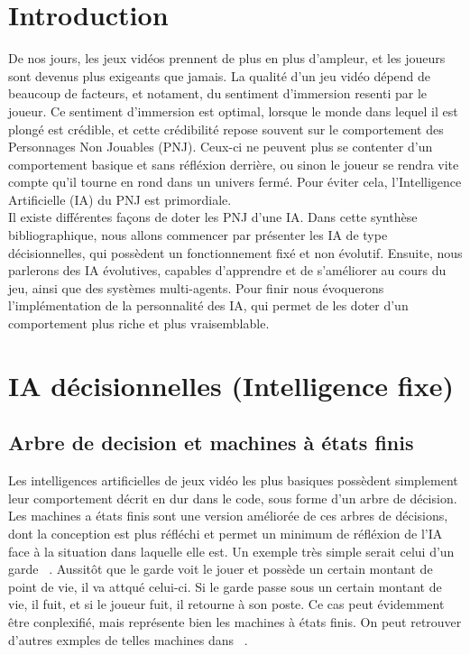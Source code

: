 \documentclass[asi]{picINSA}
\begin{document}
	
	\couverture{}
	
\newpage\null\thispagestyle{empty}\newpage
\tableofcontents{}

\chapter{Introduction}
De nos jours, les jeux vidéos prennent de plus en plus d'ampleur, et les joueurs sont devenus plus exigeants que jamais. La qualité d'un jeu vidéo dépend de beaucoup de facteurs, et notament, du sentiment d'immersion resenti par le joueur. Ce sentiment d'immersion est optimal, lorsque le monde dans lequel il est plongé est crédible, et cette crédibilité repose souvent sur le comportement des Personnages Non Jouables (PNJ). Ceux-ci ne peuvent plus se contenter d'un comportement basique et sans réfléxion derrière, ou sinon le joueur se rendra vite compte qu'il tourne en rond dans un univers fermé. Pour éviter cela, l'Intelligence Artificielle (IA) du PNJ est primordiale. \\
Il existe différentes façons de doter les PNJ d'une IA. Dans cette synthèse bibliographique, nous allons commencer par présenter les IA de type décisionnelles, qui possèdent un fonctionnement fixé et non évolutif. Ensuite, nous parlerons des IA évolutives, capables d'apprendre et de s'améliorer au cours du jeu, ainsi que des systèmes multi-agents. Pour finir nous évoquerons l'implémentation de la personnalité des IA, qui permet de les doter d'un comportement plus riche et plus vraisemblable.


\chapter{IA décisionnelles (Intelligence fixe)}
\section{Arbre de decision et machines à états finis}
Les intelligences artificielles de jeux vidéo les plus basiques possèdent simplement leur comportement décrit en dur dans le code, sous forme d’un arbre de décision. \\
Les machines a états finis sont une version améliorée de ces arbres de décisions, dont la conception est plus réfléchi et permet un minimum de réfléxion de l'IA face à la situation dans laquelle elle est. Un exemple très simple serait celui d'un garde ~\cite{MindGames}. Aussitôt que le garde voit le jouer et possède un certain montant de point de vie, il va attqué celui-ci. Si le garde passe sous un certain montant de vie, il fuit, et si le joueur fuit, il retourne à son poste. Ce cas peut évidemment être conplexifié, mais représente bien les machines à états finis. On peut retrouver d'autres exmples de telles machines dans ~\cite{khoo2002applying}.\\
\end{document}
